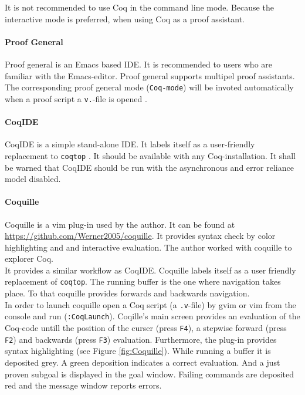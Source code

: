 It is not recommended to use Coq in the command line mode. 
Because the interactive mode is preferred, when using Coq as a proof assistant. 


\paragraph{Proof General}

Proof general is an Emacs based IDE. 
It is recommended to users who are familiar with the Emacs-editor.
Proof general supports multipel proof assistants. 
The corresponding proof general mode (\lstinline!Coq-mode!) will be invoted automatically when a proof script a \lstinline!v.!-file is opened \cite{PROOFGENERAL}. 
\paragraph{CoqIDE}

CoqIDE is a simple stand-alone IDE. 
It labels itself as a user-friendly replacement to \lstinline!coqtop! \cite{COQIDE}.   
It should be available with any Coq-installation. 
It shall be warned that CoqIDE should be run with the asynchronous and error reliance model disabled. 

\paragraph{Coquille}

Coquille is a vim plug-in used by the author.
It can be found at \url{https://github.com/Werner2005/coquille}.
It provides syntax check by color highlighting and and interactive evaluation.  
The author worked with coquille to explorer Coq.\\
It provides a similar workflow as CoqIDE. 
Coquille labels itself as a user friendly  replacement of \lstinline!coqtop!. 
The running buffer is the one where navigation takes place. 
To that coquille provides forwards and backwards navigation.\\


In order to launch coquille open a Coq script (a \texttt{.v}-file) by gvim or vim from the console and run (\texttt{:CoqLaunch}). 
Coqille's main screen provides an evaluation of the Coq-code untill the position of the curser (press \texttt{F4}), a stepwise forward (press \texttt{F2}) and backwards (press \texttt{F3}) evaluation.                 
Furthermore, the plug-in provides syntax highlighting (see Figure \ref{fig:Coquille}).
While running a buffer it is deposited grey.
A green deposition indicates a correct evaluation. 
And a just proven subgoal is displayed in the goal window. 
Failing commands are deposited red and the message window reports errors.


